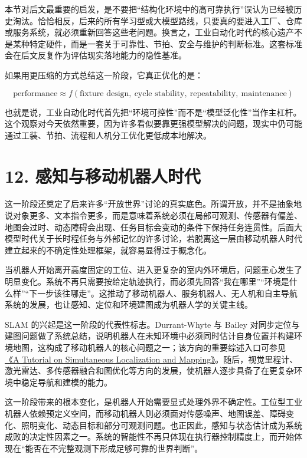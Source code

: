 本节对后文最重要的启发，是不要把“结构化环境中的高可靠执行”误认为已经被历史淘汰。恰恰相反，后来的所有学习型或大模型路线，只要真的要进入工厂、仓库或服务系统，就必须重新回答这些老问题。换言之，工业自动化时代的核心遗产不是某种特定硬件，而是一套关于可靠性、节拍、安全与维护的判断标准。这套标准会在后文反复作为评估现实落地能力的隐性基准。

如果用更压缩的方式总结这一阶段，它真正优化的是：

\begingroup
\scriptsize
\begin{equation*}
\text{performance} \approx f(\text{fixture design},\ \text{cycle stability},\ \text{repeatability},\ \text{maintenance})
\end{equation*}
\endgroup

也就是说，工业自动化时代首先把“环境可控性”而不是“模型泛化性”当作主杠杆。这个观察对今天依然重要，因为许多看似要靠更强模型解决的问题，现实中仍可能通过工装、节拍、流程和人机分工优化更低成本地解决。

\chapter*{12. 感知与移动机器人时代}

这一阶段还奠定了后来许多“开放世界”讨论的真实底色。所谓开放，并不是抽象地说对象更多、文本指令更多，而是意味着系统必须在局部可观测、传感器有偏差、地图会过时、动态障碍会出现、任务目标会变动的条件下保持任务连贯性。后面大模型时代关于长时程任务与外部记忆的许多讨论，若脱离这一层由移动机器人时代建立起来的不确定性处理框架，就容易显得过于概念化。

当机器人开始离开高度固定的工位、进入更复杂的室内外环境后，问题重心发生了明显变化。系统不再只需要按给定轨迹执行，而必须先回答“我在哪里”“环境是什么样”“下一步该往哪走”。这推动了移动机器人、服务机器人、无人机和自主导航系统的发展，也让感知、定位和环境建图成为机器人学的关键主线。

SLAM 的兴起是这一阶段的代表性标志。Durrant-Whyte 与 Bailey 对同步定位与建图问题做了系统总结，说明机器人在未知环境中必须同时估计自身位置并构建环境地图，这构成了移动机器人的核心问题之一；该方向的重要综述入口可参见 \href{https://ieeexplore.ieee.org/document/1638022}{《A Tutorial on Simultaneous Localization and Mapping》}。随后，视觉里程计、激光雷达、多传感器融合和图优化等方向的发展，使机器人逐步具备了在更复杂环境中稳定导航和建模的能力。

这一阶段带来的根本变化，是机器人开始需要显式处理外界不确定性。工位型工业机器人依赖预定义空间，而移动机器人则必须面对传感噪声、地图误差、障碍变化、照明变化、动态目标和部分可观测问题。也正因此，感知与状态估计成为系统成败的决定性因素之一。系统的智能性不再只体现在执行器控制精度上，而开始体现在“能否在不完整观测下形成足够可靠的世界判断”。

